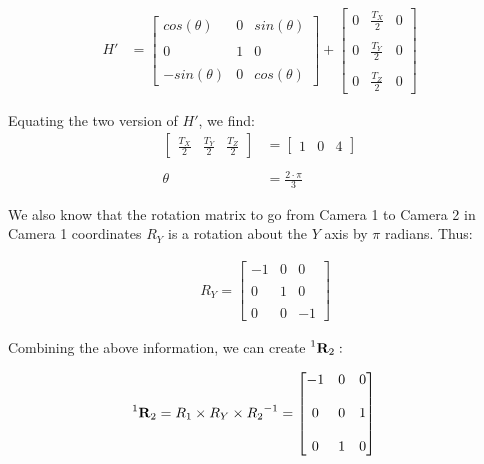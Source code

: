 \documentclass[12pt, oneside]{article}
\begin{document}
\begin{align*}
    H'  &=
        \begin{bmatrix} cos(\theta)  & 0 & sin(\theta) \\ \\
            0  & 1 & 0 \\  \\
            -sin(\theta)   & 0 & cos(\theta) 
        \end{bmatrix} +
        \begin{bmatrix} 0  & \frac{T_X}{2} & 0 \\ \\
            0  & \frac{T_Y}{2} & 0 \\ \\
            0  & \frac{T_Z}{2} & 0 
        \end{bmatrix} 
\end{align*}

Equating the two version of $H'$, we find:
\begin{align*}
    \begin{bmatrix} \frac{T_X}{2} & \frac{T_Y}{2} & \frac{T_Z}{2} 
    \end{bmatrix}  &= 
    \begin{bmatrix} 1 & 0 & 4 
    \end{bmatrix} \\  \\
    \theta &= \frac{2 \cdot \pi }{3}
\end{align*}

We also know that the rotation matrix to go from Camera 1 to Camera 2 in Camera
1 coordinates $R_Y$ is a rotation about the $Y$ axis by $\pi$ radians. Thus:

\begin{align*}
    & R_Y =  
    \begin{bmatrix} -1  & 0 & 0 \\ \\ 
                    0   & 1 & 0 \\ \\ 
                    0   & 0 & -1 \end{bmatrix} 
\end{align*}

Combining the above information, we can create $ \prescript{1}{}{\mathbf{R}_2}:$

\begin{align*}
    & \prescript{1}{}{\mathbf{R}_2} 
    =  R_1 \times R_Y \times {R_2}^{-1}
    = \begin{bmatrix} -1  & 0 & 0 \\ \\ 
                    0   & 0 & 1 \\ \\ 
                    0   & 1 & 0 \end{bmatrix} 
\end{align*}
\end{document}
